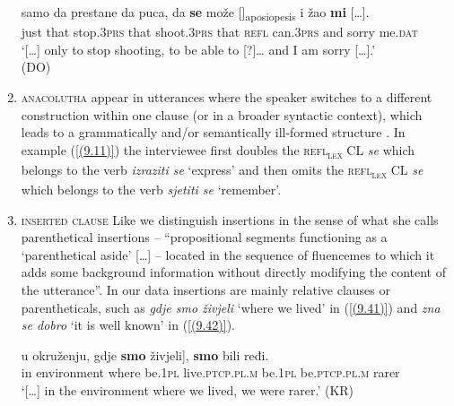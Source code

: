 \begin{enumerate}
\begin{exe}
\ex\label{(9.10)}
\gll  [\dots] samo da prestane da puca, da \textbf{se} može []\textsubscript{aposiopesis} i žao {\textbf{mi}  [\dots].}\\
{} just that stop.3\textsc{prs} that shoot.3\textsc{prs} that \textsc{refl} can.3\textsc{prs} {} and sorry me.\textsc{dat} \\
\glt ‘[\dots] only to stop shooting, to be able to [?]… and I am sorry  [\dots].’ \\
\hfill (DO)
\end{exe}

\item \textsc{anacolutha} appear in utterances where the speaker switches to a different construction within one clause (or in a broader syntactic context), which leads to a grammatically and/or semantically ill-formed structure \citep[cf.][]{Karlik17b}. In example (\ref{(9.11)}) the interviewee first doubles the \textsc{refl\textsubscript{lex}} CL \textit{se} which belongs to the verb \textit{izraziti se} ‘express’ and then omits the \textsc{refl\textsubscript{lex}} CL \textit{se} which belongs to the verb \textit{sjetiti se} ‘remember’.


\item \textsc{inserted clause} Like \citet[75]{Crible18} we distinguish insertions in the sense of what she calls parenthetical insertions – “propositional segments functioning as a ‘parenthetical aside’ [\dots] – located in the sequence of fluencemes to which it adds some background information without directly modifying the content of the utterance”. In our data insertions are mainly relative clauses or parentheticals, such as \textit{gdje smo živjeli} ‘where we lived’ in (\ref{(9.41)}) and \textit{zna se dobro} ‘it is well known’ in (\ref{(9.42)}). 

\begin{exe}\ex\label{(9.41)}
\gll  [\dots] u okruženju, \minsp{[} gdje \textbf{smo} živjeli], \textbf{smo} bili ređi. \\
{} in environment {} where be.1\textsc{pl} live.\textsc{ptcp}.\textsc{pl}.\textsc{m} be.1\textsc{pl} be.\textsc{ptcp}.\textsc{pl}.\textsc{m} rarer \\
\glt ‘[\dots] in the environment where we lived, we were rarer.’
\hfill (KR)


\end{exe}
\end{enumerate}
